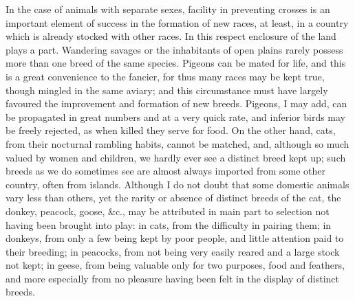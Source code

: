 \indent In the case of animals with separate sexes, facility in preventing crosses is an important element of success in the formation of new races, at least, in a country which is already stocked with other races. In this respect enclosure of the land plays a part.  Wandering savages or the inhabitants of open plains rarely possess more than one breed of the same species. Pigeons can be mated for life, and this is a great convenience to the fancier, for thus many races may be kept true, though mingled in the same aviary; and this circumstance must have largely favoured the improvement and formation of new breeds. Pigeons, I may add, can be propagated in great numbers and at a very quick rate, and inferior birds may be freely rejected, as when killed they serve for food. On the other hand, cats, from their nocturnal rambling habits, cannot be matched, and, although so much valued by women and children, we hardly ever see a distinct breed kept up; such breeds as we do sometimes see are almost always imported from some other country, often from islands.  Although I do not doubt that some domestic animals vary less than others, yet the rarity or absence of distinct breeds of the cat, the donkey, peacock, goose, \&c., may be attributed in main part to selection not having been brought into play: in cats, from the difficulty in pairing them; in donkeys, from only a few being kept by poor people, and little attention paid to their breeding; in peacocks, from not being very easily reared and a large stock not kept; in geese, from being valuable only for two purposes, food and feathers, and more especially from no pleasure having been felt in the display of distinct breeds.  \\
